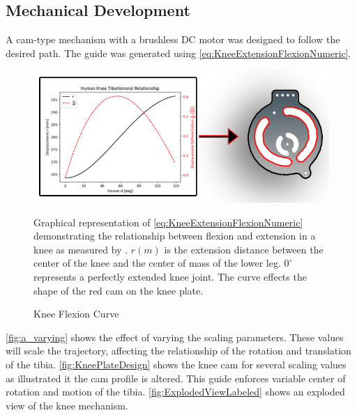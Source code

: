 

\subsection{Mechanical Development}

A cam-type mechanism with a brushless DC motor was designed to follow the desired path. The guide was generated using \autoref{eq:KneeExtensionFlexionNumeric}. 


\begin{figure}[ht!]
    \centering
    \includegraphics[scale=0.9]{images/mech_design/knee_plate_main_annotated.png}
    \caption{Knee Flexion Curve}{Graphical representation of \autoref{eq:KneeExtensionFlexionNumeric} demonstrating the relationship between flexion and extension in a knee as measured by \cite{KinDynKneeJoint}. \(r(m)\) is the extension distance between the center of the knee and the center of mass of the lower leg. $0^\circ$ represents a perfectly extended knee joint. The curve effects the shape of the red cam on the knee plate. }
    \label{fig:FlexExtRelationship}
\end{figure} 


\autoref{fig:a_varying} shows the effect of varying the scaling parameters. These values will scale the trajectory, affecting the relationship of the rotation and translation of the tibia. \autoref{fig:KneePlateDesign} shows the knee cam for several scaling values as illustrated it the cam profile is altered. This guide enforces variable center of rotation and motion of the tibia. \autoref{fig:ExplodedViewLabeled} shows an exploded view of the knee mechanism. 

